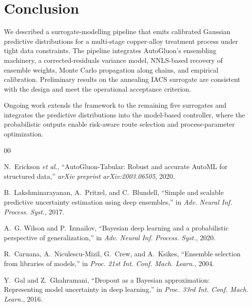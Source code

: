 \documentclass[conference]{IEEEtran}
\begin{document}
\section{Conclusion}
\label{sec:conclusion}

We described a surrogate-modelling pipeline that emits calibrated Gaussian predictive distributions for a multi-stage copper-alloy treatment process under tight data constraints. The pipeline integrates AutoGluon's ensembling machinery, a corrected-residuals variance model, NNLS-based recovery of ensemble weights, Monte Carlo propagation along chains, and empirical calibration. Preliminary results on the annealing IACS surrogate are consistent with the design and meet the operational acceptance criterion.

Ongoing work extends the framework to the remaining five surrogates and integrates the predictive distributions into the model-based controller, where the probabilistic outputs enable risk-aware route selection and process-parameter optimization.

\begin{thebibliography}{00}

N.~Erickson \emph{et al.}, ``AutoGluon-Tabular: Robust and accurate AutoML for structured data,'' \emph{arXiv preprint arXiv:2003.06505}, 2020.

B.~Lakshminarayanan, A.~Pritzel, and C.~Blundell, ``Simple and scalable predictive uncertainty estimation using deep ensembles,'' in \emph{Adv. Neural Inf. Process. Syst.}, 2017.

A.~G. Wilson and P.~Izmailov, ``Bayesian deep learning and a probabilistic perspective of generalization,'' in \emph{Adv. Neural Inf. Process. Syst.}, 2020.

R.~Caruana, A.~Niculescu-Mizil, G.~Crew, and A.~Ksikes, ``Ensemble selection from libraries of models,'' in \emph{Proc. 21st Int. Conf. Mach. Learn.}, 2004.

Y.~Gal and Z.~Ghahramani, ``Dropout as a Bayesian approximation: Representing model uncertainty in deep learning,'' in \emph{Proc. 33rd Int. Conf. Mach. Learn.}, 2016.

\end{thebibliography}
\end{document}
